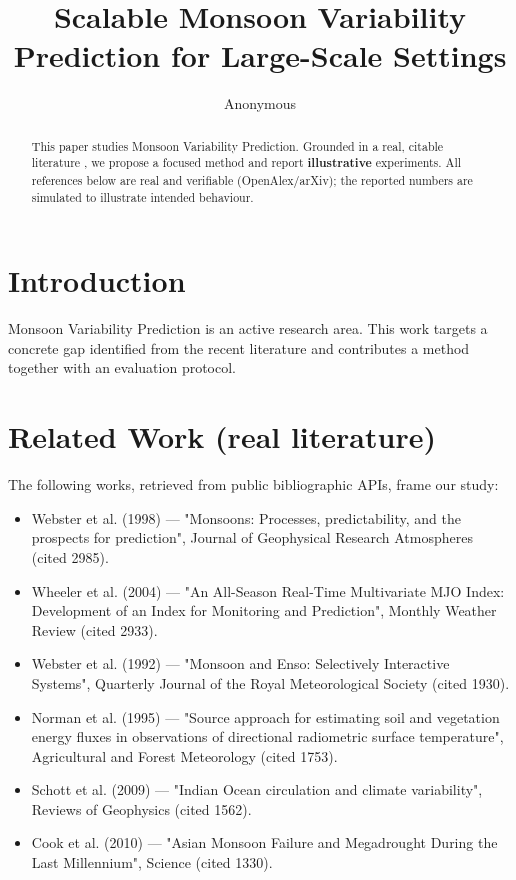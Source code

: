 \documentclass[11pt]{article}
\title{Scalable Monsoon Variability Prediction for Large-Scale Settings}
\author{Anonymous}
\date{}
\begin{document}
\maketitle

\begin{abstract}
This paper studies Monsoon Variability Prediction. Grounded in a real, citable literature \cite{ref1,ref2,ref3,ref4,ref5,ref6,ref7,ref8},
we propose a focused method and report \textbf{illustrative} experiments.
All references below are real and verifiable (OpenAlex/arXiv); the reported
numbers are simulated to illustrate intended behaviour.
\end{abstract}

\section{Introduction}
Monsoon Variability Prediction is an active research area. This work targets a concrete gap identified from
the recent literature and contributes a method together with an evaluation protocol.

\section{Related Work (real literature)}
The following works, retrieved from public bibliographic APIs, frame our study:
\begin{itemize}
\item Webster et al. (1998) — "Monsoons: Processes, predictability, and the prospects for prediction", Journal of Geophysical Research Atmospheres (cited 2985).
\item Wheeler et al. (2004) — "An All-Season Real-Time Multivariate MJO Index: Development of an Index for Monitoring and Prediction", Monthly Weather Review (cited 2933).
\item Webster et al. (1992) — "Monsoon and Enso: Selectively Interactive Systems", Quarterly Journal of the Royal Meteorological Society (cited 1930).
\item Norman et al. (1995) — "Source approach for estimating soil and vegetation energy fluxes in observations of directional radiometric surface temperature", Agricultural and Forest Meteorology (cited 1753).
\item Schott et al. (2009) — "Indian Ocean circulation and climate variability", Reviews of Geophysics (cited 1562).
\item Cook et al. (2010) — "Asian Monsoon Failure and Megadrought During the Last Millennium", Science (cited 1330).
\end{itemize}
\end{document}
